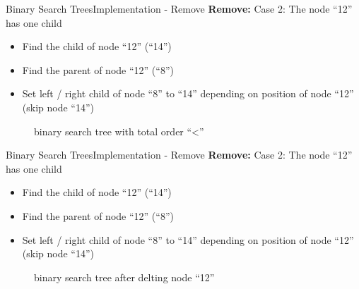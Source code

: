 \begin{frame}{Binary Search Trees}{Implementation - Remove}
  \textbf{Remove:} Case 2: The node \enquote{12} has one child\\
  \begin{itemize}
    \item<2->
      Find the {\color{Mittel-Blau}child} of node \enquote{12} (\enquote{14})
    \item<3->
      Find the {\color{Mittel-Blau}parent} of node \enquote{12} (\enquote{8})
    \item<4->
      Set left / right {\color{Mittel-Blau}child} of node \enquote{8} to
      \enquote{14} depending on position of node \enquote{12}
      (skip node \enquote{14})
  \end{itemize}
  \vspace{-0.5em}
  \begin{figure}
    
    \vspace{-0.75em}
    \caption{binary search tree with total order
      \enquote{\color{Mittel-Blau}<}}
    \label{fig:binary_search_trees:binary_tree_remove_one_child}
  \end{figure}
\end{frame}


\begin{frame}{Binary Search Trees}{Implementation - Remove}
  \textbf{Remove:} Case 2: The node \enquote{12} has one child\\
  \begin{itemize}
    \item
      Find the {\color{Mittel-Blau}child} of node \enquote{12} (\enquote{14})
    \item
      Find the {\color{Mittel-Blau}parent} of node \enquote{12} (\enquote{8})
    \item
      Set left / right {\color{Mittel-Blau}child} of node \enquote{8} to
      \enquote{14} depending on position of node \enquote{12}
      (skip node \enquote{14})
  \end{itemize}
  \vspace{-0.5em}
  \begin{figure}
    
    \vspace{-0.75em}
    \caption{binary search tree after delting node \enquote{12}}
    \label{fig:binary_search_trees:binary_tree_remove_one_child_result}
  \end{figure}
\end{frame}

